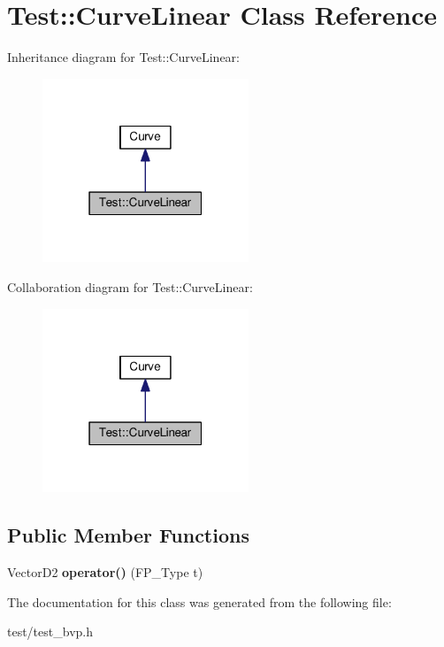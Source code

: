 \hypertarget{classTest_1_1CurveLinear}{}\section{Test\+:\+:Curve\+Linear Class Reference}
\label{classTest_1_1CurveLinear}


Inheritance diagram for Test\+:\+:Curve\+Linear\+:\nopagebreak
\begin{figure}[H]
\begin{center}
\leavevmode
\includegraphics[width=175pt]{classTest_1_1CurveLinear__inherit__graph}
\end{center}
\end{figure}


Collaboration diagram for Test\+:\+:Curve\+Linear\+:\nopagebreak
\begin{figure}[H]
\begin{center}
\leavevmode
\includegraphics[width=175pt]{classTest_1_1CurveLinear__coll__graph}
\end{center}
\end{figure}
\subsection*{Public Member Functions}
\begin{DoxyCompactItemize}
\item 
\mbox{\label{classTest_1_1CurveLinear_aa260424d3fa52ecacb9ef438c9c2b8e8}} 
Vector\+D2 {\bfseries operator()} (F\+P\+\_\+\+Type t)
\end{DoxyCompactItemize}


The documentation for this class was generated from the following file\+:\begin{DoxyCompactItemize}
\item 
test/test\+\_\+bvp.\+h\end{DoxyCompactItemize}
